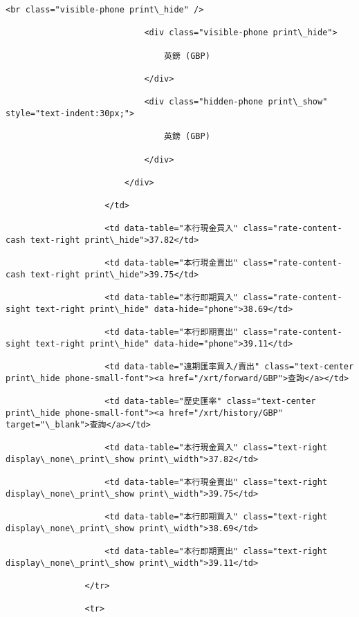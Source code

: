 \documentclass[11pt]{article}
\begin{document}
\begin{Verbatim}[commandchars=\\\{\}]
                            <br class="visible-phone print\_hide" />

                            <div class="visible-phone print\_hide">

                                英鎊 (GBP)

                            </div>

                            <div class="hidden-phone print\_show" style="text-indent:30px;">

                                英鎊 (GBP)

                            </div>

                        </div>

                    </td>

                    <td data-table="本行現金買入" class="rate-content-cash text-right print\_hide">37.82</td>

                    <td data-table="本行現金賣出" class="rate-content-cash text-right print\_hide">39.75</td>

                    <td data-table="本行即期買入" class="rate-content-sight text-right print\_hide" data-hide="phone">38.69</td>

                    <td data-table="本行即期賣出" class="rate-content-sight text-right print\_hide" data-hide="phone">39.11</td>

                    <td data-table="遠期匯率買入/賣出" class="text-center print\_hide phone-small-font"><a href="/xrt/forward/GBP">查詢</a></td>

                    <td data-table="歷史匯率" class="text-center print\_hide phone-small-font"><a href="/xrt/history/GBP" target="\_blank">查詢</a></td>

                    <td data-table="本行現金買入" class="text-right display\_none\_print\_show print\_width">37.82</td>

                    <td data-table="本行現金賣出" class="text-right display\_none\_print\_show print\_width">39.75</td>

                    <td data-table="本行即期買入" class="text-right display\_none\_print\_show print\_width">38.69</td>

                    <td data-table="本行即期賣出" class="text-right display\_none\_print\_show print\_width">39.11</td>

                </tr>

                <tr>


\end{Verbatim}
\end{document}

